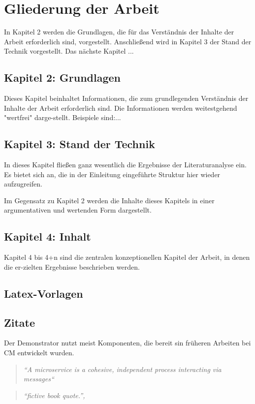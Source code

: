 \section{Gliederung der Arbeit}
\label{sec:gliederung}

In Kapitel 2 werden die Grundlagen, die für das Verständnis der Inhalte der Arbeit erforderlich sind, vorgestellt.
Anschließend wird in Kapitel 3 der Stand der Technik vorgestellt.
Das nächste Kapitel ...


\newpage
\subsection*{Kapitel 2: Grundlagen}



Dieses Kapitel beinhaltet Informationen, die zum grundlegenden Verständnis der Inhalte der Arbeit erforderlich sind. Die Informationen werden weitestgehend "wertfrei" darge-stellt. Beispiele sind:...

\subsection*{Kapitel 3: Stand der Technik}

In dieses Kapitel fließen ganz wesentlich die Ergebnisse der Literaturanalyse ein. Es bietet sich an, die in der Einleitung eingeführte Struktur hier wieder aufzugreifen.

Im Gegensatz zu Kapitel 2 werden die Inhalte dieses Kapitels in einer argumentativen und wertenden Form dargestellt.

\subsection*{Kapitel 4: Inhalt}

Kapitel 4 bis 4+n sind die zentralen konzeptionellen Kapitel der Arbeit, in denen die er-zielten Ergebnisse beschrieben werden.

\subsection{Latex-Vorlagen}

\subsection{Zitate}
\label{subsec:zitate}
Der Demonstrator nutzt meist Komponenten, die bereit sin früheren Arbeiten bei \gls{CM} entwickelt wurden.
\begin{quote}
\textit{``A microservice is a cohesive, independent process interacting via messages``}
\end{quote}
\begin{quote}
\textit{``fictive book quote.'', \cite[S.~99]{Be02}}
\end{quote}

